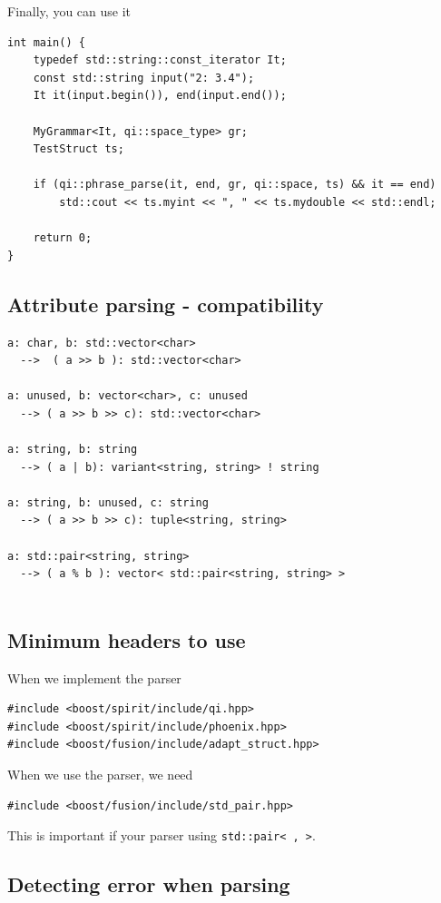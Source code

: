 Finally, you can use it
\begin{verbatim}
int main() {
    typedef std::string::const_iterator It;
    const std::string input("2: 3.4");
    It it(input.begin()), end(input.end());

    MyGrammar<It, qi::space_type> gr;
    TestStruct ts;

    if (qi::phrase_parse(it, end, gr, qi::space, ts) && it == end)
        std::cout << ts.myint << ", " << ts.mydouble << std::endl;

    return 0;
}
\end{verbatim}

\subsection{Attribute parsing - compatibility}
\label{sec:associate_attribute_compatible-type}

\begin{verbatim}
a: char, b: std::vector<char> 
  -->  ( a >> b ): std::vector<char>

a: unused, b: vector<char>, c: unused 
  --> ( a >> b >> c): std::vector<char>

a: string, b: string 
  --> ( a | b): variant<string, string> ! string

a: string, b: unused, c: string 
  --> ( a >> b >> c): tuple<string, string>

a: std::pair<string, string> 
  --> ( a % b ): vector< std::pair<string, string> >
    
\end{verbatim}


\subsection{Minimum headers to use}

When we implement the parser
\begin{verbatim}
#include <boost/spirit/include/qi.hpp>
#include <boost/spirit/include/phoenix.hpp>
#include <boost/fusion/include/adapt_struct.hpp>
\end{verbatim}

When we use the parser, we need
\begin{verbatim}
#include <boost/fusion/include/std_pair.hpp>
\end{verbatim}
This is important if your parser using \verb!std::pair< , >!.

\subsection{Detecting error when parsing}

